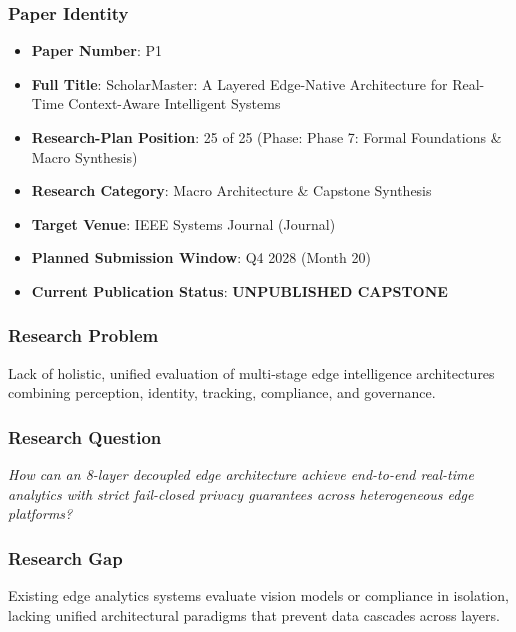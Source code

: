 \documentclass[11pt,letterpaper]{article}
\begin{document}
\subsubsection{Paper Identity}
\begin{itemize}[leftmargin=*]
    \item \textbf{Paper Number}: P1
    \item \textbf{Full Title}: ScholarMaster: A Layered Edge-\allowbreak Native Architecture for Real-\allowbreak Time Context-\allowbreak Aware Intelligent Systems
    \item \textbf{Research-Plan Position}: 25 of 25 (Phase: Phase 7: Formal Foundations \& Macro Synthesis)
    \item \textbf{Research Category}: Macro Architecture \& Capstone Synthesis
    \item \textbf{Target Venue}: IEEE Systems Journal (Journal)
    \item \textbf{Planned Submission Window}: Q4 2028 (Month 20)
    \item \textbf{Current Publication Status}: \textbf{UNPUBLISHED CAPSTONE}
\end{itemize}

\subsubsection{Research Problem}
Lack of holistic, unified evaluation of multi-\allowbreak stage edge intelligence architectures combining perception, identity, tracking, compliance, and governance.

\subsubsection{Research Question}
\begin{tcolorbox}[colback=blue!3!white,colframe=blue!50!black,title=Primary Scientific Question]
\textit{How can an 8-\allowbreak layer decoupled edge architecture achieve end-\allowbreak to-\allowbreak end real-\allowbreak time analytics with strict fail-\allowbreak closed privacy guarantees across heterogeneous edge platforms?}
\end{tcolorbox}

\subsubsection{Research Gap}
Existing edge analytics systems evaluate vision models or compliance in isolation, lacking unified architectural paradigms that prevent data cascades across layers.
\end{document}
